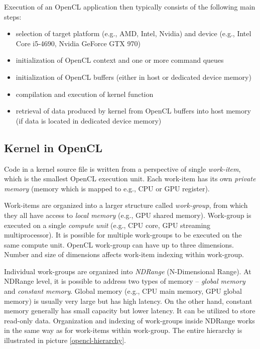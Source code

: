 \documentclass
[
    digital, %
    oneside, %
    table, %
    nolof, %
    nolot, %
    nocover %
]{fithesis3}
\begin{document}
Execution of an OpenCL application then typically consists of the following main steps:
\begin{itemize}
    \item selection of target platform (e.g., AMD, Intel, Nvidia) and device (e.g., Intel Core i5-4690, Nvidia GeForce GTX 970)
    \item initialization of OpenCL context and one or more command queues
    \item initialization of OpenCL buffers (either in host or dedicated device memory)
    \item compilation and execution of kernel function
    \item retrieval of data produced by kernel from OpenCL buffers into host memory (if data is located in dedicated device memory)
\end{itemize}

\subsection{Kernel in OpenCL}
\label{kernel}
Code in a kernel source file is written from a perspective of single \textit{work-item}, which is the smallest OpenCL execution unit. Each work-item
has its own \textit{private memory} (memory which is mapped to e.g., CPU or GPU register).

Work-items are organized into a larger structure called \textit{work-group}, from which they all have access to \textit{local memory} (e.g., GPU shared
memory). Work-group is executed on a single \textit{compute unit} (e.g., CPU core, GPU streaming multiprocessor). It is possible for multiple work-groups
to be executed on the same compute unit. OpenCL work-group can have up to three dimensions. Number and size of dimensions affects work-item indexing
within work-group.

Individual work-groups are organized into \textit{NDRange} (N-Dimensional Range). At NDRange level, it is possible to address two types of memory --
\textit{global memory} and \textit{constant memory}. Global memory (e.g., CPU main memory, GPU global memory) is usually very large but has high
latency. On the other hand, constant memory generally has small capacity but lower latency. It can be utilized to store read-only data. Organization
and indexing of work-groups inside NDRange works in the same way as for work-items within work-group. The entire hierarchy is illustrated in picture
\ref{opencl-hierarchy}.
\end{document}
